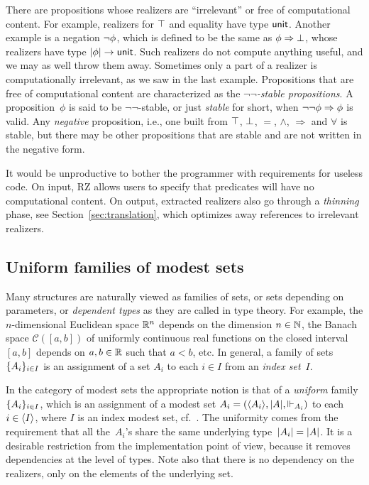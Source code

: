 There are propositions whose realizers are ``irrelevant'' or free of
computational content. For example, realizers for $\top$ and
equality have type $\mathsf{unit}$. Another example is a negation
$\lnot \phi$, which is defined to be the same as
$\phi\Rightarrow \bot$, whose realizers have type
$|\phi| \to \mathsf{unit}$. Such realizers do not compute
anything useful, and we may as well throw them away. Sometimes only a
part of a realizer is computationally irrelevant, as we saw in the
last example. Propositions that are free of computational content
are characterized as the \emph{$\lnot\lnot$-stable propositions}. A
proposition~$\phi$ is said to be $\lnot\lnot$-stable, or just
\emph{stable} for short, when $\lnot \lnot \phi\Rightarrow \phi$ is
valid. Any \emph{negative} proposition, i.e., one built from $\top$,
$\bot$, $=$, $\land$, $\Rightarrow$ and $\forall$ is stable, but
there may be other propositions that are stable and are not written
in the negative form.

It would be unproductive to bother the programmer with requirements
for useless code.  On input, RZ allows users to specify that  
predicates will have no computational content.  On output, extracted
realizers also go through a \emph{thinning} phase, see Section~\ref{sec:translation}, which
optimizes away references to irrelevant realizers.

\subsection{Uniform families of modest sets}
\label{sec:uniform-families}

Many structures are naturally viewed as families of sets, or sets
depending on parameters, or \emph{dependent types} as they are called
in type theory. For example, the $n$-dimensional Euclidean space
$\mathbb{R}^n$ depends on the dimension $n \in \mathbb{N}$, the Banach space
$\mathcal{C}([a,b])$ of uniformly continuous real functions on the
closed interval $[a,b]$ depends on $a, b \in \mathbb{R}$ such that $a < b$,
etc. In general, a family of sets $\{A_i\}_{i \in I}$ is an
assignment of a set $A_i$ to each $i \in I$ from an \emph{index
  set}~$I$.

In the category of modest sets the appropriate notion is that of a
\emph{uniform} family~$\{A_i\}_{i \in I}$, which is an assignment
of a modest set $A_i = (\langle A_i \rangle, |A|, {\Vdash_{A_i}})$ to each
$i \in \langle I \rangle$, where $I$ is an index modest set,
cf.~\cite{Jacobs,Birkedal}. The uniformity comes from the requirement
that all the~$A_i$'s share the same underlying type~$|A_i| =
|A|$. It is a desirable restriction from the implementation
point of view, because it removes dependencies at the level of types.
Note also that there is no dependency on the realizers, only on the
elements of the underlying set.


